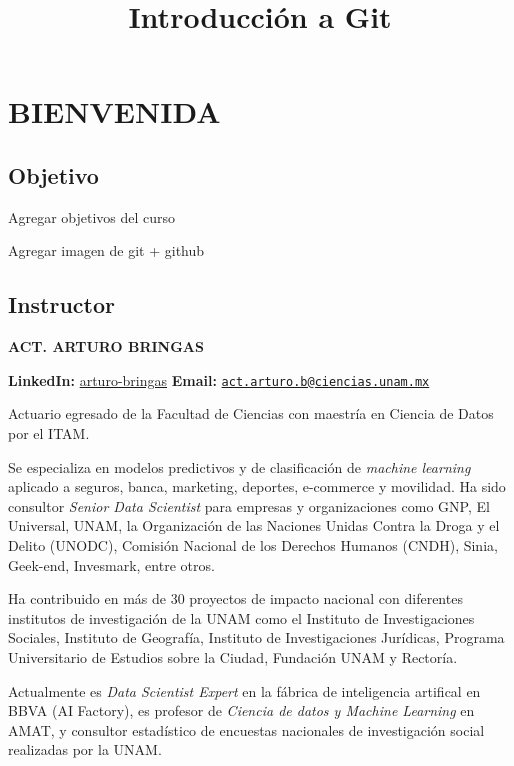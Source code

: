 \documentclass[
]{book}
\title{Introducción a Git}
\author{}
\date{\vspace{-2.5em}}
\begin{document}
\maketitle

{
\setcounter{tocdepth}{1}
\tableofcontents
}
\chapter*{BIENVENIDA}\label{bienvenida}

\section*{Objetivo}\label{objetivo}

Agregar objetivos del curso

Agregar imagen de git + github

\section*{Instructor}\label{instructor}

\textbf{ACT. ARTURO BRINGAS}

\textbf{LinkedIn:} \href{https://www.linkedin.com/in/arturo-bringas/}{arturo-bringas}
\textbf{Email:} \href{mailto:act.arturo.b@ciencias.unam.mx}{\nolinkurl{act.arturo.b@ciencias.unam.mx}}

Actuario egresado de la Facultad de Ciencias con maestría en Ciencia de Datos por el ITAM.

Se especializa en modelos predictivos y de clasificación de \emph{machine learning} aplicado a seguros, banca, marketing, deportes, e-commerce y movilidad. Ha sido consultor \emph{Senior Data Scientist} para empresas y organizaciones como GNP, El Universal, UNAM, la Organización de las Naciones Unidas Contra la Droga y el Delito (UNODC), Comisión Nacional de los Derechos Humanos (CNDH), Sinia, Geek-end, Invesmark, entre otros.

Ha contribuido en más de 30 proyectos de impacto nacional con diferentes institutos de investigación de la UNAM como el Instituto de Investigaciones Sociales, Instituto de Geografía, Instituto de Investigaciones Jurídicas, Programa Universitario de Estudios sobre la Ciudad, Fundación UNAM y Rectoría.

Actualmente es \emph{Data Scientist Expert} en la fábrica de inteligencia artifical en BBVA (AI Factory), es profesor de \emph{Ciencia de datos y Machine Learning} en AMAT, y consultor estadístico de encuestas nacionales de investigación social realizadas por la UNAM.
\end{document}
